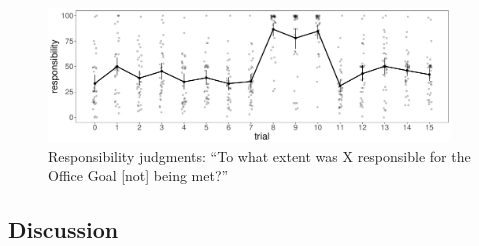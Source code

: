 \documentclass[11pt]{article}
\begin{document}
\begin{figure}[H]
	\centering
	\includegraphics[width=0.95\textwidth]{responsibility_judgments}
	\caption{Responsibility judgments: ``To what extent was X responsible for the Office Goal [not] being met?''}
	\label{fig:responsibility_judgments}
\end{figure}

\subsection{Discussion}
\label{sub:discussion}
\end{document}
